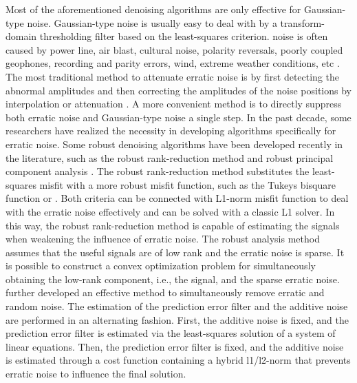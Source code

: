 Most of the aforementioned denoising algorithms are only effective for Gaussian-type noise. Gaussian-type noise is usually easy to deal with by a transform-domain thresholding filter based on the least-squares criterion.   noise is often caused by power line, air blast, cultural noise, polarity reversals, poorly coupled geophones, recording and parity errors, wind, extreme weather conditions, etc \cite[]{trickett2012robust}. The most traditional method to attenuate erratic noise is by first detecting the abnormal amplitudes and then correcting the amplitudes of the noise positions by interpolation or attenuation \cite[]{anderson1989automatic,schonewille2008swell}. A more convenient method is to directly suppress both erratic noise and Gaussian-type noise  a single step. In the past decade, some researchers have realized the necessity in developing algorithms specifically for erratic noise. Some robust denoising algorithms have been developed recently in the literature, such as the robust rank-reduction method \cite[]{chen2014robust} and robust principal component analysis \cite[]{candes2011robust}. The robust rank-reduction method substitutes the least-squares misfit with a more robust misfit function, such as the Tukeys bisquare function \cite[]{beaton1974fitting} or . Both criteria can be connected with  L1-norm misfit function to deal with the erratic noise effectively and can be solved with a classic L1 solver. In this way, the robust rank-reduction method is capable of estimating the signals when weakening the influence of  erratic noise.  The robust  analysis method assumes that the useful signals are of low rank and the erratic noise is sparse. It is possible to construct a convex optimization problem for simultaneously obtaining the low-rank component, i.e., the signal, and the sparse erratic noise. \cite{chen2017robust} further developed an effective method to simultaneously remove erratic and random noise. The estimation of the prediction error filter and the additive noise are performed in an alternating fashion. First, the additive noise is fixed, and the prediction error filter is estimated via the least-squares solution of a system of linear equations. Then, the prediction error filter is fixed, and the additive noise is estimated through a cost function containing a hybrid l1/l2-norm that prevents erratic noise to influence the final solution.

